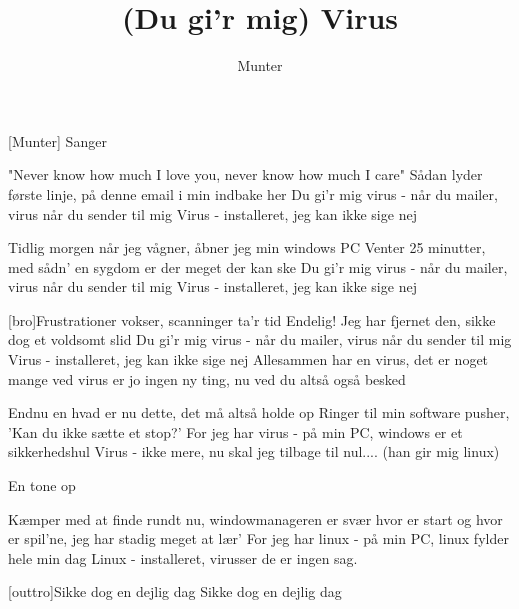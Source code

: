 \documentclass[a4paper,11pt]{article}
\title{(Du gi'r mig) Virus}
\author{Munter}
\begin{document}
\maketitle

\begin{roles}
[Munter] Sanger
\end{roles}

\begin{props}
\prop{}
\end{props}

  
\begin{song}

"Never know how much I love you, never know how much I care"
Sådan lyder første linje, på denne email i min indbake her
Du gi'r mig virus - når du mailer, virus når du sender til mig
Virus - installeret, jeg kan ikke sige nej

Tidlig morgen når jeg vågner, åbner jeg min windows PC
Venter 25 minutter, med sådn' en sygdom er der meget der kan ske
Du gi'r mig virus - når du mailer, virus når du sender til mig
Virus - installeret, jeg kan ikke sige nej

[bro]Frustrationer vokser, scanninger ta'r tid
Endelig! Jeg har fjernet den, sikke dog et voldsomt slid
Du gi'r mig virus - når du mailer, virus når du sender til mig
Virus - installeret, jeg kan ikke sige nej
Allesammen har en virus, det er noget mange ved
virus er jo ingen ny ting, nu ved du altså også besked

Endnu en hvad er nu dette, det må altså holde op
Ringer til min software pusher, 'Kan du ikke sætte et stop?'
For jeg har virus - på min PC, windows er et sikkerhedshul
Virus - ikke mere, nu skal jeg tilbage til nul.... (han gir mig linux)

En tone op

Kæmper med at finde rundt nu, windowmanageren er svær
hvor er start og hvor er spil'ne, jeg har stadig meget at lær'
For jeg har linux - på min PC, linux fylder hele min dag
Linux - installeret, virusser de er ingen sag.

[outtro]Sikke dog en dejlig dag
Sikke dog en dejlig dag

\end{song}
\end{document}
